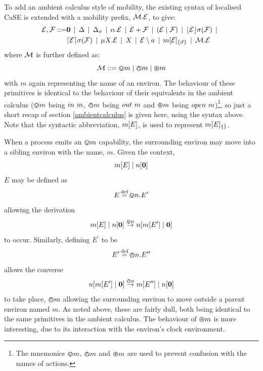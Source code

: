 To add an ambient calculus style of mobility, the existing syntax of
localised CaSE is extended with a mobility prefix, $\text{$\mathcal{M}$} . \text{$\mathcal{E}$}$,
to give:
\begin{equation}
  \begin{aligned}
    \text{$\mathcal{E}$}, \text{$\mathcal{F}$} \mathrel{::=} &
    \textbf{0}  \;\,|\,\; 
    \Delta \;\,|\,\; 
    \Delta_{\sigma} \;\,|\,\; 
    \alpha . \text{$\mathcal{E}$}  \;\,|\,\;
    \text{$\mathcal{E}$} + \text{$\mathcal{F}$} \;\,|\,\; 
    (\text{$\mathcal{E}$}\;|\;\text{$\mathcal{F}$})\;\,|\,\; 
    \lfloor{\text{$\mathcal{E}$}}\rfloor {\sigma} ({\text{$\mathcal{F}$}}) \;\,|\,\; \\
    & \lceil{\text{$\mathcal{E}$}}\rceil {\sigma} ({\text{$\mathcal{F}$}}) \;\,|\,\; 
    \mu X . \text{$\mathcal{E}$} \;\,|\,\; 
    X \;\,|\,\; 
    \text{$\mathcal{E}$} \setminus a \;\,|\,\; 
    {m}[ \text{$\mathcal{E}$} ]_{\{\vec{\sigma}\}} \;\,|\,\;
    \text{$\mathcal{M}$} . \text{$\mathcal{E}$}
  \end{aligned}
\end{equation}
where $\text{$\mathcal{M}$}$ is further defined as:
\begin{equation}
   \text{$\mathcal{M}$} \mathrel{::=} \varovee m \mid \varowedge m \mid \varoast m 
\end{equation}
with $m$ again representing the name of an environ.  The behaviour of
these primitives is identical to the behaviour of their equivalents in
the ambient calculus ($\varovee m$ being $in\ m$, $\varowedge m$ being
$out\ m$ and $\varoast m$ being $open\ m$)\footnote{The mnemonics
$\varovee m$, $\varowedge m$ and $\varoast m$ are used to prevent
confusion with the names of actions.}, so just a short recap of section
\ref{ambientcalculus} is given here, using the syntax above.  Note that
the syntactic abbreviation, ${m}[ E ]$, is used to represent
${m}[ E ]_{\{\}}$.

When a process emits an $\varovee m$ capability, the surrounding environ
may move into a sibling environ with the name, $m$.  Given the context,
\begin{equation}
{m}[ E ]\;|\;{n}[ \textbf{0} ]
\end{equation}
$E$ may be defined as
\begin{equation}
E \operatorname{\stackrel{\textrm{def}}{=}} \varovee n.E^\prime
\end{equation}
allowing the derivation
\begin{equation}
{m}[ E ]\;|\;{n}[ \textbf{0} ] \stackrel{\varovee n}{\rightarrow} 
{n}[ {m}[ E^\prime ]\;|\;\textbf{0} ]
\end{equation}
to occur.  Similarly, defining $E^\prime$ to be
\begin{equation}
E^\prime \operatorname{\stackrel{\textrm{def}}{=}} \varowedge n.E^{\prime\prime}
\end{equation}
allows the converse
\begin{equation}
{n}[ {m}[ E^\prime ]\;|\;\textbf{0} ] \stackrel{\varowedge n}{\rightarrow}
{m}[ E^{\prime\prime} ]\;|\;{n}[ \textbf{0} ]
\end{equation}
to take place, $\varowedge m$ allowing the surrounding environ
to move outside a parent environ named $m$.  As noted above, these are
fairly dull, both being identical to the same primitives in the ambient
calculus.  The behaviour of $\varoast m$ is more interesting, due to
its interaction with the environ's clock environment.

